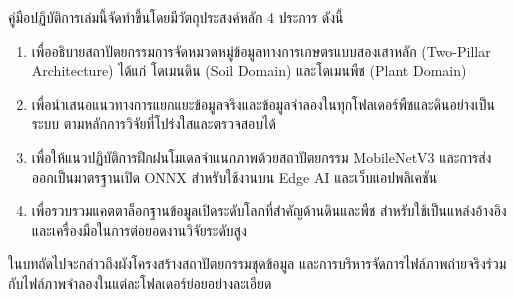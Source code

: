 คู่มือปฏิบัติการเล่มนี้จัดทำขึ้นโดยมีวัตถุประสงค์หลัก 4 ประการ ดังนี้

\begin{enumerate}
    \item เพื่ออธิบายสถาปัตยกรรมการจัดหมวดหมู่ข้อมูลทางการเกษตรแบบสองเสาหลัก (Two-Pillar Architecture) ได้แก่ โดเมนดิน (Soil Domain) และโดเมนพืช (Plant Domain)
    \item เพื่อนำเสนอแนวทางการแยกแยะข้อมูลจริงและข้อมูลจำลองในทุกโฟลเดอร์พืชและดินอย่างเป็นระบบ ตามหลักการวิจัยที่โปร่งใสและตรวจสอบได้
    \item เพื่อให้แนวปฏิบัติการฝึกฝนโมเดลจำแนกภาพด้วยสถาปัตยกรรม MobileNetV3 และการส่งออกเป็นมาตรฐานเปิด ONNX สำหรับใช้งานบน Edge AI และเว็บแอปพลิเคชัน
    \item เพื่อรวบรวมแคตตาล็อกฐานข้อมูลเปิดระดับโลกที่สำคัญด้านดินและพืช สำหรับใช้เป็นแหล่งอ้างอิงและเครื่องมือในการต่อยอดงานวิจัยระดับสูง
\end{enumerate}

ในบทถัดไปจะกล่าวถึงผังโครงสร้างสถาปัตยกรรมชุดข้อมูล และการบริหารจัดการไฟล์ภาพถ่ายจริงร่วมกับไฟล์ภาพจำลองในแต่ละโฟลเดอร์ย่อยอย่างละเอียด
